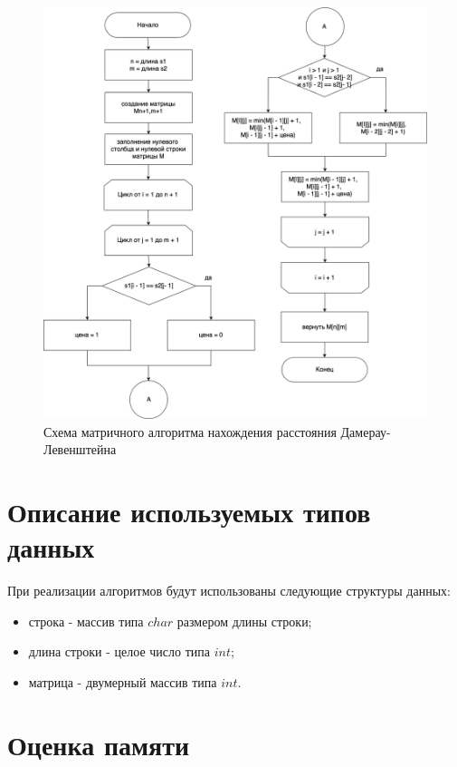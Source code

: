 \documentclass[a4paper,14pt, unknownkeysallowed]{extreport}
\begin{document}
\begin{figure}[h]
	\centering
	\includegraphics[scale=0.48]{img/dam_lev_table_scheme.png}
	\caption{Схема матричного алгоритма нахождения расстояния Дамерау-Левенштейна}
	\label{fig:DL_table}
\end{figure}

\clearpage

\section{Описание используемых типов данных}

При реализации алгоритмов будут использованы следующие структуры данных:

\begin{itemize}
	\item строка - массив типа $char$ размером длины строки;
	\item длина строки - целое число типа $int$;
	\item матрица - двумерный массив типа $int$.
\end{itemize}

\section{Оценка памяти}
\end{document}
